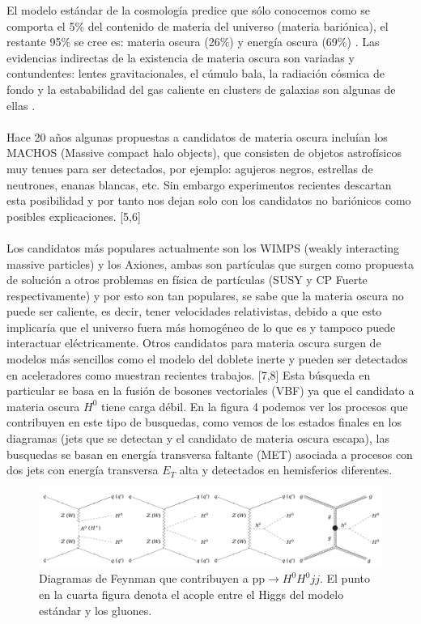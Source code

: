 El modelo estándar de la cosmología predice que sólo conocemos como se comporta el 5\% del contenido de materia del universo (materia bariónica), el restante 95\% se cree es: materia oscura (26\%) y energía oscura (69\%) \cite{Ade:2015xua}. Las evidencias indirectas de la existencia de materia oscura son variadas y contundentes: lentes gravitacionales, el cúmulo bala, la radiación cósmica de fondo y la estababilidad del gas caliente en clusters de galaxias son algunas de ellas \cite{Freese:2017idy}. 
\\
\\
Hace 20 años algunas propuestas a candidatos de materia oscura incluían los MACHOS (Massive compact halo objects), que consisten de objetos astrofísicos muy tenues para ser detectados, por ejemplo: agujeros negros, estrellas de neutrones, enanas blancas, etc. Sin embargo experimentos recientes descartan esta posibilidad y por tanto nos dejan solo con los candidatos no bariónicos como posibles explicaciones. [5,6]
\\
\\
Los candidatos más populares actualmente son los WIMPS (weakly interacting massive particles) y los Axiones, ambas son partículas que surgen como propuesta de solución a otros problemas en física de partículas (SUSY y CP Fuerte respectivamente) y por esto son tan populares, se sabe que la materia oscura no puede ser caliente, es decir, tener velocidades relativistas, debido a que esto implicaría que el universo fuera más homogéneo de lo que es y tampoco puede interactuar eléctricamente. Otros candidatos para materia oscura surgen de modelos más sencillos como el modelo del doblete inerte y pueden ser detectados en aceleradores como muestran recientes trabajos. [7,8] Esta búsqueda en particular se basa en la fusión de bosones vectoriales (VBF) ya que el candidato a materia oscura $H^0$ tiene carga débil. En la figura 4 podemos ver los procesos que contribuyen en este tipo de busquedas, como vemos de los estados finales en los diagramas (jets que se detectan y el candidato de materia oscura escapa), las busquedas se basan en energía transversa faltante (MET) asociada a procesos con dos jets con energía transversa $E_T$ alta y detectados en hemisferios diferentes.
\begin{figure}
	\centering
	\includegraphics[width=15cm]{F4.png}
	\caption{\label{fig:frog} Diagramas de Feynman que contribuyen a pp$\rightarrow H^0H^0 jj$. El punto en la cuarta figura denota el acople entre el Higgs del modelo estándar y los gluones.}
\end{figure}
